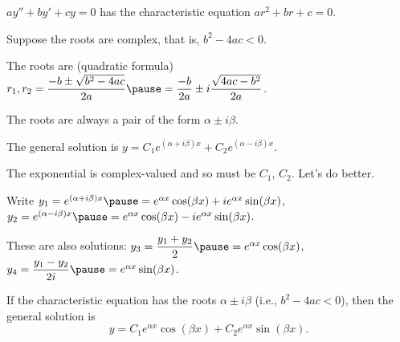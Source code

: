 \documentclass[10pt,aspectratio=169]{beamer}
\begin{document}
\begin{frame}
$ay'' + by' + cy = 0$ has the characteristic equation $a r^2 + b r + c = 0$.

\medskip
\pause

Suppose the roots are complex, that is, $b^2 - 4ac < 0$.

\medskip
\pause

The roots are (quadratic formula)
\quad
$r_1,r_2
=
\dfrac{-b \pm \sqrt{b^2 - 4ac}}{2a}
\pause
=
\dfrac{-b}{2a} \pm i\dfrac{\sqrt{4ac - b^2}}{2a}$.

\medskip
\pause

The roots are always a pair of the form $\alpha \pm i \beta$.

\medskip
\pause

The general solution is
\quad
$y = C_1 e^{(\alpha+i\beta)x} + C_2 e^{(\alpha-i\beta)x}$.

\medskip
\pause

The exponential is complex-valued and so must be $C_1$, $C_2$.
Let's do better.

\medskip
\pause

Write
\quad
$y_1
= e^{(\alpha+i\beta)x}
\pause
=
e^{\alpha x} \cos (\beta x) + i e^{\alpha x} \sin (\beta x)$,
\pause
\quad
$y_2
= e^{(\alpha-i\beta)x}
\pause
=
e^{\alpha x} \cos (\beta x) - i e^{\alpha x} \sin (\beta x)$.

\medskip
\pause

These are also solutions:
\quad
$y_3 = \dfrac{y_1 + y_2}{2}
\pause 
= e^{\alpha x} \cos (\beta x)$,
\pause
\quad
$y_4  = \dfrac{y_1 - y_2}{2i}
\pause
= e^{\alpha x} \sin (\beta x)$.

\pause
\begin{theorem}
If the characteristic equation has the roots $\alpha \pm i \beta$
(i.e., $b^2 - 4ac < 0$),
then the general solution is
\[
y = C_1 e^{\alpha x} \cos (\beta x) + C_2 e^{\alpha x} \sin (\beta x) .
\]
\end{theorem}
\end{frame}
\end{document}
